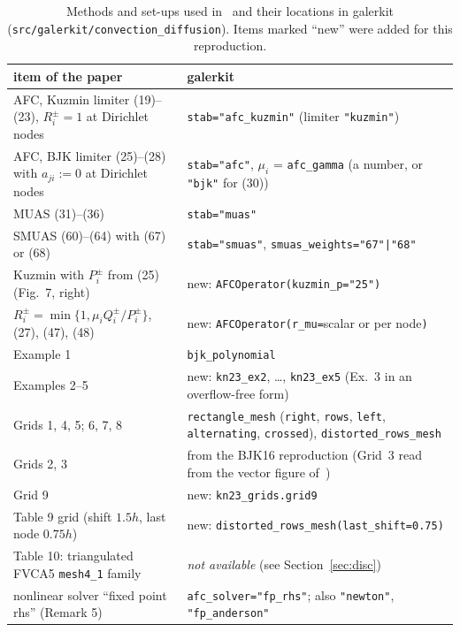 \documentclass[11pt]{article}
\begin{document}
\begin{table}[!htbp]
\renewcommand{\thetable}{I}
\centering\small\setlength{\tabcolsep}{4pt}
\caption{Methods and set-ups used in~\cite{Kn23} and their locations in galerkit
(\texttt{src/galerkit/convection\_diffusion}). Items marked ``new'' were added for this reproduction.}\label{tab:kn23-impl}
\begin{tabular}{p{6.2cm}p{8.6cm}}
\toprule
item of the paper & galerkit\\
\midrule
AFC, Kuzmin limiter (19)--(23), $R_i^\pm=1$ at Dirichlet nodes & \texttt{stab="afc\_kuzmin"} (limiter \texttt{"kuzmin"})\\
AFC, BJK limiter (25)--(28) with $a_{ji}:=0$ at Dirichlet nodes & \texttt{stab="afc"}, $\mu_i$ = \texttt{afc\_gamma} (a number, or \texttt{"bjk"} for (30))\\
MUAS (31)--(36) & \texttt{stab="muas"}\\
SMUAS (60)--(64) with (67) or (68) & \texttt{stab="smuas"}, \texttt{smuas\_weights="67"|"68"}\\
Kuzmin with $P_i^\pm$ from (25) (Fig.~7, right) & new: \texttt{AFCOperator(kuzmin\_p="25")}\\
$R_i^\pm=\min\{1,\mu_iQ_i^\pm/P_i^\pm\}$, (27), (47), (48) & new: \texttt{AFCOperator(r\_mu=}scalar or per node\texttt{)}\\
Example 1 & \texttt{bjk\_polynomial}\\
Examples 2--5 & new: \texttt{kn23\_ex2}, \dots, \texttt{kn23\_ex5} (Ex.~3 in an overflow-free form)\\
Grids 1, 4, 5; 6, 7, 8 & \texttt{rectangle\_mesh} (\texttt{right}, \texttt{rows}, \texttt{left}, \texttt{alternating}, \texttt{crossed}), \texttt{distorted\_rows\_mesh}\\
Grids 2, 3 & from the BJK16 reproduction (Grid~3 read from the vector figure of~\cite{BJK16})\\
Grid 9 & new: \texttt{kn23\_grids.grid9}\\
Table 9 grid (shift $1.5h$, last node $0.75h$) & new: \texttt{distorted\_rows\_mesh(last\_shift=0.75)}\\
Table 10: triangulated FVCA5 \texttt{mesh4\_1} family & \emph{not available} (see Section~\ref{sec:disc})\\
nonlinear solver ``fixed point rhs'' (Remark 5) & \texttt{afc\_solver="fp\_rhs"}; also \texttt{"newton"}, \texttt{"fp\_anderson"}\\
\bottomrule
\end{tabular}
\end{table}
\end{document}
